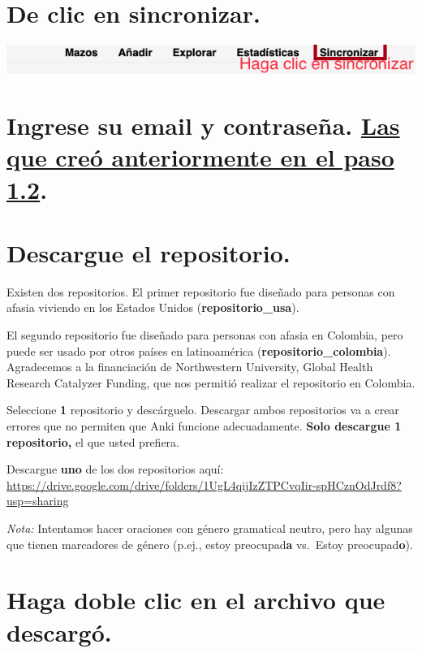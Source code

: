 \documentclass[
]{book}
\begin{document}
\section{De clic en sincronizar.}\label{de-clic-en-sincronizar.}

\includegraphics[width=0.6\linewidth]{images/reposit_sp/clic_sincronizar}

\section{\texorpdfstring{Ingrese su email y contraseña. \hyperref[cross_1]{Las que creó anteriormente en el paso 1.2}.}{Ingrese su email y contraseña. Las que creó anteriormente en el paso 1.2.}}\label{ingrese-su-email-y-contraseuxf1a.-las-que-creuxf3-anteriormente-en-el-paso-1.2.}

\section{Descargue el repositorio.}\label{descargue-el-repositorio.}

Existen dos repositorios. El primer repositorio fue diseñado para personas con afasia viviendo en los Estados Unidos (\textbf{repositorio\_usa}).

El segundo repositorio fue diseñado para personas con afasia en Colombia, pero puede ser usado por otros países en latinoamérica (\textbf{repositorio\_colombia}). Agradecemos a la financiación de Northwestern University, Global Health Research Catalyzer Funding, que nos permitió realizar el repositorio en Colombia.

Seleccione \textbf{1} repositorio y descárguelo. Descargar ambos repositorios va a crear errores que no permiten que Anki funcione adecuadamente. \textbf{Solo descargue 1 repositorio,} el que usted prefiera.

Descargue \textbf{uno} de los dos repositorios aquí: \url{https://drive.google.com/drive/folders/1UgL4qijIzZTPCvqIir-spHCznOdJrdf8?usp=sharing}

\emph{Nota:} Intentamos hacer oraciones con género gramatical neutro, pero hay algunas que tienen marcadores de género (p.ej., estoy preocupad\textbf{a} vs.~Estoy preocupad\textbf{o}).

\section{Haga doble clic en el archivo que descargó.}\label{haga-doble-clic-en-el-archivo-que-descarguxf3.}
\end{document}
